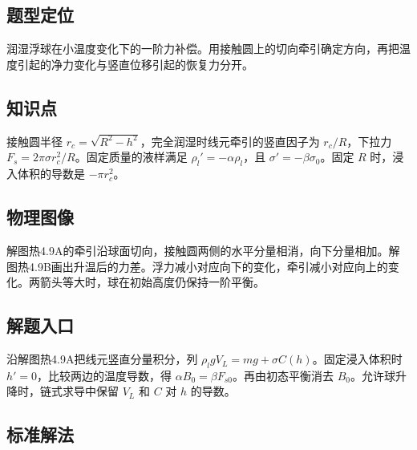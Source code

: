 \documentclass[UTF8,fontset=fandol,a4paper,11pt]{ctexart}
\begin{document}

\subsection*{题型定位}

润湿浮球在小温度变化下的一阶力补偿。用接触圆上的切向牵引确定方向，再把温度引起的净力变化与竖直位移引起的恢复力分开。



\subsection*{知识点}

接触圆半径 $r_c=\sqrt{R^2-h^2}$，完全润湿时线元牵引的竖直因子为 $r_c/R$，下拉力 $F_s=2\pi\sigma r_c^2/R$。固定质量的液样满足 $\rho_l'=-\alpha\rho_l$，且 $\sigma'=-\beta\sigma_0$。固定 $R$ 时，浸入体积的导数是 $-\pi r_c^2$。




\subsection*{物理图像}

解图热4.9A的牵引沿球面切向，接触圆两侧的水平分量相消，向下分量相加。解图热4.9B画出升温后的力差。浮力减小对应向下的变化，牵引减小对应向上的变化。两箭头等大时，球在初始高度仍保持一阶平衡。



\subsection*{解题入口}

沿解图热4.9A把线元竖直分量积分，列 $\rho_lgV_L=mg+\sigma C(h)$。固定浸入体积时 $h'=0$，比较两边的温度导数，得 $\alpha B_0=\beta F_{s0}$。再由初态平衡消去 $B_0$。允许球升降时，链式求导中保留 $V_L$ 和 $C$ 对 $h$ 的导数。




\subsection*{标准解法}
\end{document}

